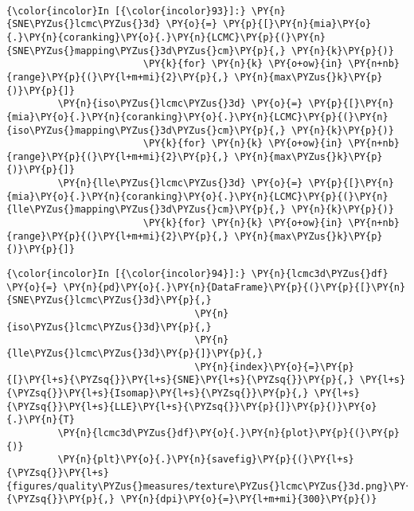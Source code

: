     \begin{center}
    \end{center}
    { \hspace*{\fill} \\}

    \begin{Verbatim}[commandchars=\\\{\}]
{\color{incolor}In [{\color{incolor}93}]:} \PY{n}{SNE\PYZus{}lcmc\PYZus{}3d} \PY{o}{=} \PY{p}{[}\PY{n}{mia}\PY{o}{.}\PY{n}{coranking}\PY{o}{.}\PY{n}{LCMC}\PY{p}{(}\PY{n}{SNE\PYZus{}mapping\PYZus{}3d\PYZus{}cm}\PY{p}{,} \PY{n}{k}\PY{p}{)}
                        \PY{k}{for} \PY{n}{k} \PY{o+ow}{in} \PY{n+nb}{range}\PY{p}{(}\PY{l+m+mi}{2}\PY{p}{,} \PY{n}{max\PYZus{}k}\PY{p}{)}\PY{p}{]}
         \PY{n}{iso\PYZus{}lcmc\PYZus{}3d} \PY{o}{=} \PY{p}{[}\PY{n}{mia}\PY{o}{.}\PY{n}{coranking}\PY{o}{.}\PY{n}{LCMC}\PY{p}{(}\PY{n}{iso\PYZus{}mapping\PYZus{}3d\PYZus{}cm}\PY{p}{,} \PY{n}{k}\PY{p}{)}
                        \PY{k}{for} \PY{n}{k} \PY{o+ow}{in} \PY{n+nb}{range}\PY{p}{(}\PY{l+m+mi}{2}\PY{p}{,} \PY{n}{max\PYZus{}k}\PY{p}{)}\PY{p}{]}
         \PY{n}{lle\PYZus{}lcmc\PYZus{}3d} \PY{o}{=} \PY{p}{[}\PY{n}{mia}\PY{o}{.}\PY{n}{coranking}\PY{o}{.}\PY{n}{LCMC}\PY{p}{(}\PY{n}{lle\PYZus{}mapping\PYZus{}3d\PYZus{}cm}\PY{p}{,} \PY{n}{k}\PY{p}{)}
                        \PY{k}{for} \PY{n}{k} \PY{o+ow}{in} \PY{n+nb}{range}\PY{p}{(}\PY{l+m+mi}{2}\PY{p}{,} \PY{n}{max\PYZus{}k}\PY{p}{)}\PY{p}{]}
\end{Verbatim}

    \begin{Verbatim}[commandchars=\\\{\}]
{\color{incolor}In [{\color{incolor}94}]:} \PY{n}{lcmc3d\PYZus{}df} \PY{o}{=} \PY{n}{pd}\PY{o}{.}\PY{n}{DataFrame}\PY{p}{(}\PY{p}{[}\PY{n}{SNE\PYZus{}lcmc\PYZus{}3d}\PY{p}{,}
                                 \PY{n}{iso\PYZus{}lcmc\PYZus{}3d}\PY{p}{,}
                                 \PY{n}{lle\PYZus{}lcmc\PYZus{}3d}\PY{p}{]}\PY{p}{,}
                                 \PY{n}{index}\PY{o}{=}\PY{p}{[}\PY{l+s}{\PYZsq{}}\PY{l+s}{SNE}\PY{l+s}{\PYZsq{}}\PY{p}{,} \PY{l+s}{\PYZsq{}}\PY{l+s}{Isomap}\PY{l+s}{\PYZsq{}}\PY{p}{,} \PY{l+s}{\PYZsq{}}\PY{l+s}{LLE}\PY{l+s}{\PYZsq{}}\PY{p}{]}\PY{p}{)}\PY{o}{.}\PY{n}{T}
         \PY{n}{lcmc3d\PYZus{}df}\PY{o}{.}\PY{n}{plot}\PY{p}{(}\PY{p}{)}
         \PY{n}{plt}\PY{o}{.}\PY{n}{savefig}\PY{p}{(}\PY{l+s}{\PYZsq{}}\PY{l+s}{figures/quality\PYZus{}measures/texture\PYZus{}lcmc\PYZus{}3d.png}\PY{l+s}{\PYZsq{}}\PY{p}{,} \PY{n}{dpi}\PY{o}{=}\PY{l+m+mi}{300}\PY{p}{)}
\end{Verbatim}

